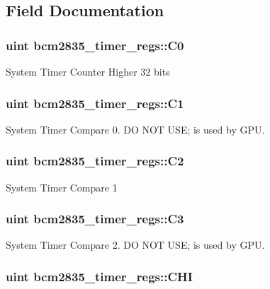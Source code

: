 \subsection{Field Documentation}
\hypertarget{structbcm2835__timer__regs_aa6325a3d70a2699ba480cded96f7dea1}{
\subsubsection[{C0}]{\setlength{\rightskip}{0pt plus 5cm}uint bcm2835\-\_\-timer\-\_\-regs\-::\-C0}}\label{structbcm2835__timer__regs_aa6325a3d70a2699ba480cded96f7dea1}
System Timer Counter Higher 32 bits \hypertarget{structbcm2835__timer__regs_a250bb05291838b608e985f641566f81e}{
\subsubsection[{C1}]{\setlength{\rightskip}{0pt plus 5cm}uint bcm2835\-\_\-timer\-\_\-regs\-::\-C1}}\label{structbcm2835__timer__regs_a250bb05291838b608e985f641566f81e}
System Timer Compare 0. D\-O N\-O\-T U\-S\-E; is used by G\-P\-U. \hypertarget{structbcm2835__timer__regs_a69ec03747d89bbfd4dfc86fd9673fcfc}{
\subsubsection[{C2}]{\setlength{\rightskip}{0pt plus 5cm}uint bcm2835\-\_\-timer\-\_\-regs\-::\-C2}}\label{structbcm2835__timer__regs_a69ec03747d89bbfd4dfc86fd9673fcfc}
System Timer Compare 1 \hypertarget{structbcm2835__timer__regs_ac67e381282c34f5b84ce4be1dbb90aff}{
\subsubsection[{C3}]{\setlength{\rightskip}{0pt plus 5cm}uint bcm2835\-\_\-timer\-\_\-regs\-::\-C3}}\label{structbcm2835__timer__regs_ac67e381282c34f5b84ce4be1dbb90aff}
System Timer Compare 2. D\-O N\-O\-T U\-S\-E; is used by G\-P\-U. \hypertarget{structbcm2835__timer__regs_a7e46f963b2a885c1509669e92d4ae172}{
\subsubsection[{C\-H\-I}]{\setlength{\rightskip}{0pt plus 5cm}uint bcm2835\-\_\-timer\-\_\-regs\-::\-C\-H\-I}}\label{structbcm2835__timer__regs_a7e46f963b2a885c1509669e92d4ae172}
